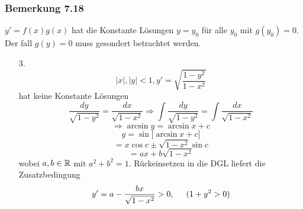 \subsubsection*{Bemerkung 7.18}
$y'=f(x)g(x)$ hat die Konstante Lösungen $y=y_0$ für alle $y_0$ mit $g(y_0)=0$. Der fall $g(y)=0$ muss gesondert betrachtet werden. 
\begin{enumerate}
\item[3.] \[\left| x\right|, \left| y\right|<1,y'=\sqrt{\frac{1-y^2}{1-x^2}}\]
hat keine Konstante Lösungen 
\[\frac{{dy}}{{\sqrt {1 - {y^2}} }} = \frac{{dx}}{{\sqrt {1 - {x^2}} }} \Rightarrow \int {\frac{{dy}}{{\sqrt {1 - {y^2}} }}}  = \int {\frac{{dx}}{{\sqrt {1 - {x^2}} }}} \]
\[\Rightarrow \arcsin y=\arcsin x+c\]
\[y=\sin\lbrack\arcsin x+c \rbrack\]
\[=x\cos c\pm\sqrt{1-x^2}\sin c\]
\[=ax+b\sqrt{1-x^2}\]
wobei $a,b\in\mathbb{R}$ mit $a^2+b^2=1$. Rückeinsetzen in die DGL liefert die Zusatzbedingung \[y'=a-\frac{bx}{\sqrt{1-x^2}}>0,\hspace{5mm} (1+y^2>0)\]
\end{enumerate}
